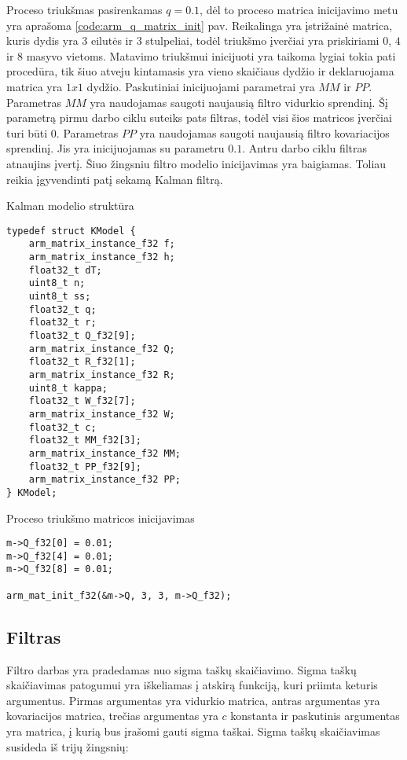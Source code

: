 Proceso triukšmas pasirenkamas $q = 0.1$, dėl to proceso matrica inicijavimo metu yra aprašoma \ref{code:arm_q_matrix_init} pav.
Reikalinga yra įstrižainė matrica, kuris dydis yra 3 eilutės ir 3 stulpeliai, todėl triukšmo įverčiai yra priskiriami $0$, $4$ ir $8$ masyvo vietoms.
Matavimo triukšmui inicijuoti yra taikoma lygiai tokia pati procedūra, tik šiuo atveju kintamasis yra vieno skaičiaus dydžio ir deklaruojama matrica yra $1x1$ dydžio.
Paskutiniai inicijuojami parametrai yra $MM$ ir $PP$.
Parametras $MM$ yra naudojamas saugoti naujausią filtro vidurkio sprendinį.
Šį parametrą pirmu darbo ciklu suteiks pats filtras, todėl visi šios matricos įverčiai turi būti $0$.
Parametras $PP$ yra naudojamas saugoti naujausią filtro kovariacijos sprendinį.
Jis yra inicijuojamas su parametru $0.1$.
Antru darbo ciklu filtras atnaujins įvertį.
Šiuo žingsniu filtro modelio inicijavimas yra baigiamas.
Toliau reikia įgyvendinti patį sekamą Kalman filtrą.

\begin{cfigure}
  \centering
  \caption{Kalman modelio struktūra}
  \label{code:kalman_model_struct}
  \begin{lstlisting}
typedef struct KModel {
    arm_matrix_instance_f32 f;
    arm_matrix_instance_f32 h;
    float32_t dT;
    uint8_t n;
    uint8_t ss;
    float32_t q;
    float32_t r;
    float32_t Q_f32[9];
    arm_matrix_instance_f32 Q;
    float32_t R_f32[1];
    arm_matrix_instance_f32 R;
    uint8_t kappa;
    float32_t W_f32[7];
    arm_matrix_instance_f32 W;
    float32_t c;
    float32_t MM_f32[3];
    arm_matrix_instance_f32 MM;
    float32_t PP_f32[9];
    arm_matrix_instance_f32 PP;
} KModel;
  \end{lstlisting}
\end{cfigure}


\begin{cfigure}
    \centering
    \caption{Proceso triukšmo matricos inicijavimas}
    \label{code:arm_q_matrix_init}
    \begin{lstlisting}
m->Q_f32[0] = 0.01;
m->Q_f32[4] = 0.01;
m->Q_f32[8] = 0.01;

arm_mat_init_f32(&m->Q, 3, 3, m->Q_f32);
    \end{lstlisting}
\end{cfigure}

\subsection{Filtras}

Filtro darbas yra pradedamas nuo sigma taškų skaičiavimo.
Sigma taškų skaičiavimas patogumui yra iškeliamas į atskirą funkciją, kuri priimta keturis argumentus.
Pirmas argumentas yra vidurkio matrica, antras argumentas yra kovariacijos matrica, trečias argumentas yra $c$ konstanta ir paskutinis argumentas yra matrica, į kurią bus įrašomi gauti sigma taškai.
Sigma taškų skaičiavimas susideda iš trijų žingsnių:

